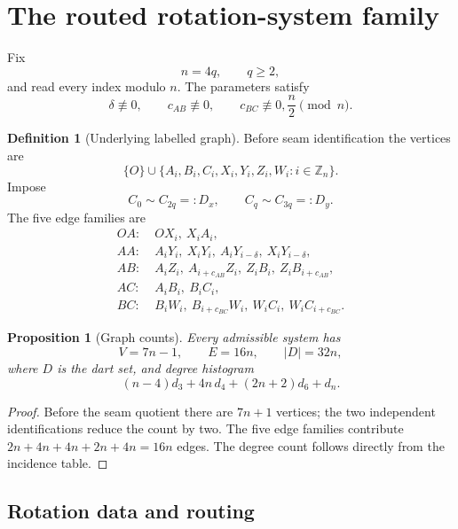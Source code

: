 \documentclass[11pt,a4paper]{article}
\newtheorem{proposition}[theorem]{Proposition}
\theoremstyle{definition}
\newtheorem{definition}[theorem]{Definition}
\newcommand{\ZZ}{\mathbb Z}
\begin{document}
\section{The routed rotation-system family}\label{sec:def}

Fix
\[
n=4q,\qquad q\ge2,
\]
and read every index modulo \(n\).
The parameters satisfy
\[
\delta\not\equiv0,\qquad
c_{AB}\not\equiv0,\qquad
c_{BC}\not\equiv0,\frac n2
\pmod n.
\]

\begin{definition}[Underlying labelled graph]
Before seam identification the vertices are
\[
\{O\}\cup
\{A_i,B_i,C_i,X_i,Y_i,Z_i,W_i:i\in\ZZ_n\}.
\]
Impose
\[
C_0\sim C_{2q}=:D_x,\qquad
C_q\sim C_{3q}=:D_y.
\]
The five edge families are
\begin{align*}
OA:\;& OX_i,\ X_iA_i,\\
AA:\;& A_iY_i,\ X_iY_i,\ A_iY_{i-\delta},\ X_iY_{i-\delta},\\
AB:\;& A_iZ_i,\ A_{i+c_{AB}}Z_i,\ Z_iB_i,\ Z_iB_{i+c_{AB}},\\
AC:\;& A_iB_i,\ B_iC_i,\\
BC:\;& B_iW_i,\ B_{i+c_{BC}}W_i,\ W_iC_i,\ W_iC_{i+c_{BC}}.
\end{align*}
\end{definition}

\begin{proposition}[Graph counts]\label{prop:counts}
Every admissible system has
\[
\boxed{V=7n-1},\qquad
\boxed{E=16n},\qquad
\boxed{|D|=32n},
\]
where \(D\) is the dart set, and degree histogram
\[
\boxed{
(n-4)d_3+4n\,d_4+(2n+2)d_6+d_n.
}
\]
\end{proposition}

\begin{proof}
Before the seam quotient there are \(7n+1\) vertices; the two independent identifications reduce the count by two.
The five edge families contribute \(2n+4n+4n+2n+4n=16n\) edges.
The degree count follows directly from the incidence table.
\end{proof}

\subsection{Rotation data and routing}
\end{document}
